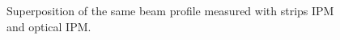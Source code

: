 \begin{figure}[!ht]
	\begin{center}
		
	\end{center}
	\caption[Superposition of the same beam profile measured with strips IPM and optical IPM]{Superposition of the same beam profile measured with strips IPM and optical IPM.}
	\label{chap4:MCP_strip}
\end{figure}

